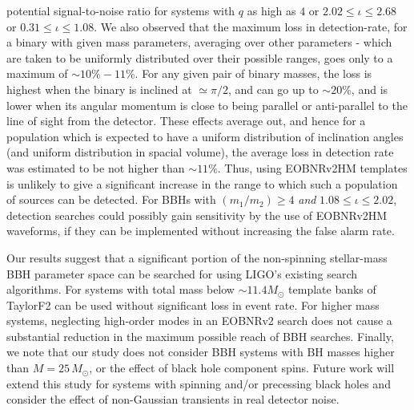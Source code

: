 potential signal-to-noise ratio for systems with $q$ as high as $4$ or
$2.02\leq\iota\leq 2.68$ or $0.31\leq\iota\leq 1.08$. We also observed that the
maximum loss in detection-rate, for a binary with given mass parameters, averaging
over other parameters - which are taken to be uniformly distributed over their 
possible ranges, goes only to a maximum of $\sim 10\% - 11\%$. For any given pair of 
binary masses, the loss is highest when the binary is inclined at $\simeq \pi/2$, 
and can go up to $\sim 20\%$, and is lower when its angular momentum is close to 
being parallel or anti-parallel to the line of sight from the detector. These effects 
average out, and hence for a population which is expected to have a uniform 
distribution of inclination angles (and uniform distribution in spacial volume), 
the average loss in detection rate was estimated to be not higher than $\sim 11\%$.
Thus, using EOBNRv2HM templates is unlikely to give a significant increase
in the range to which such a population of sources can be detected. For BBHs 
with $\left(m_1/m_2\right)\geq 4$ \textit{and} $1.08\leq\iota\leq 2.02$, detection searches 
could possibly gain sensitivity by the use of EOBNRv2HM waveforms, if they can be implemented 
without increasing the false alarm rate. 

Our results suggest that a significant portion of the non-spinning
stellar-mass BBH parameter space can be searched for using LIGO's existing
search algorithms. For systems with total mass below $\sim 11.4M_{\odot}$ template
banks of TaylorF2 can be used without significant loss in event rate. For
higher mass systems, neglecting high-order modes in an EOBNRv2 search does not
cause a substantial reduction in the maximum possible reach of BBH searches.
Finally, we note that our study does not consider BBH systems with BH
masses higher than $M = 25\,M_\odot$, or the effect of black hole component
spins. Future work will extend this study for systems with spinning and/or
precessing black holes and consider the effect of non-Gaussian transients in
real detector noise.

